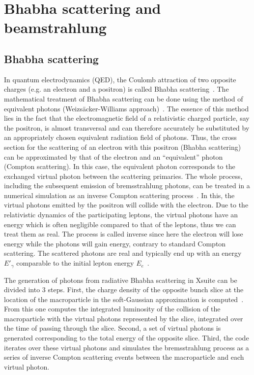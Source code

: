 \chapter{Bhabha scattering and beamstrahlung}

\section{Bhabha scattering}
In quantum electrodynamics (QED), the Coulomb attraction of two opposite charges (e.g. an electron and a positron) is called Bhabha scattering~\cite{Griffiths:111880}. The mathematical treatment of Bhabha scattering can be done using the method of equivalent photons (Weizsäcker-Williams approach)~\cite{Weizsacker1934, Williams:1935dka}. The essence of this method lies in the fact that the electromagnetic field of a relativistic charged particle, say the positron, is almost transversal and can therefore accurately be substituted by an appropriately chosen equivalent radiation field of photons. Thus, the cross section for the scattering of an electron with this positron (Bhabha scattering) can be approximated by that of the electron and an ``equivalent'' photon (Compton scattering). In this case, the equivalent photon corresponds to the exchanged virtual photon between the scattering primaries. The whole process, including the subsequent emission of bremsstrahlung photons, can be treated in a numerical simulation as an inverse Compton scattering process~\cite{Schulte:331845}. In this, the virtual photons emitted by the positron will collide with the electron. Due to the relativistic dynamics of the participating leptons, the virtual photons have an energy which is often negligible compared to that of the leptons, thus we can treat them as real. The process is called inverse since here the electron will lose energy while the photons will gain energy, contrary to standard Compton scattering. The scattered photons are real and typically end up with an energy $E'_{\gamma}$ comparable to the initial lepton energy $E_e$~\cite{ARUTYUNIAN1963176}.

The generation of photons from radiative Bhabha scattering in Xsuite can be divided into 3 steps. First, the charge density of the opposite bunch slice at the location of the macroparticle in the soft-Gaussian approximation is computed~\cite{Bassetti:122227}. From this one computes the integrated luminosity of the collision of the macroparticle with the virtual photons represented by the slice, integrated over the time of passing through the slice. Second, a set of virtual photons is generated corresponding to the total energy of the opposite slice. Third, the code iterates over these virtual photons and simulates the bremsstrahlung process as a series of inverse Compton scattering events between the macroparticle and each virtual photon. 

